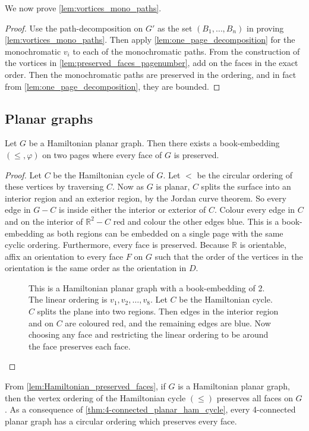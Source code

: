 We now prove \cref{lem:vortices_mono_paths}.
\begin{proof}
	Use the path-decomposition on \(G'\) as the set \((B_1, \ldots , B_n)\) in proving \cref{lem:vortices_mono_paths}. Then apply \cref{lem:one_page_decomposition} for the monochromatic \(v_i\) to each of the monochromatic paths. From the construction of the vortices in \cref{lem:preserved_faces_pagenumber}, add on the faces in the exact order. Then the monochromatic paths are preserved in the ordering, and in fact from \cref{lem:one_page_decomposition}, they are bounded.
\end{proof}
\subsection{Planar graphs}
\begin{lemma}\label{lem:Hamiltonian_preserved_faces}
	Let \(G\) be a Hamiltonian planar graph. Then there exists a book-embedding $(\leq, \varphi)$ on two pages where every face of $G$ is preserved.
\end{lemma}

\begin{proof}
	Let \(C\) be the Hamiltonian cycle of \(G\). Let \(<\) be the circular ordering of these vertices by traversing \(C\). Now as \(G\) is planar, \(C\) splits the surface into an interior region and an exterior region, by the Jordan curve theorem. So every edge in $G - C$ is inside either the interior or exterior of \(C\). Colour every edge in $C$ and on the interior of $\mathbb{R}^2 - C$ red and colour the other edges blue. This is a book-embedding as both regions can be embedded on a single page with the same cyclic ordering. Furthermore, every face is preserved. Because $\mathbb{R}$ is orientable, affix an orientation to every face \(F\) on $G$ such that the order of the vertices in the orientation is the same order as the orientation in \(D\).
	\begin{figure}[h!]
		\centering
		
		\caption[Hamiltonian planar graph]{This is a Hamiltonian planar graph with a book-embedding of 2. The linear ordering is $v_1, v_2, \ldots,  v_8$. Let $C$ be the Hamiltonian cycle. $C$ splits the plane into two regions. Then edges in the interior region and on $C$ are coloured red, and the remaining edges are blue. Now choosing any face and restricting the linear ordering to be around the face preserves each face. }\label{fig:hamiltonian_planar}
	\end{figure}
\end{proof}
From \cref{lem:Hamiltonian_preserved_faces}, if \(G\) is a Hamiltonian planar graph, then the vertex ordering of the Hamiltonian cycle \((\leq)\) preserves all faces on \(G\). As a consequence of \cref{thm:4-connected_planar_ham_cycle}, every 4-connected planar graph has a circular ordering which preserves every face.

